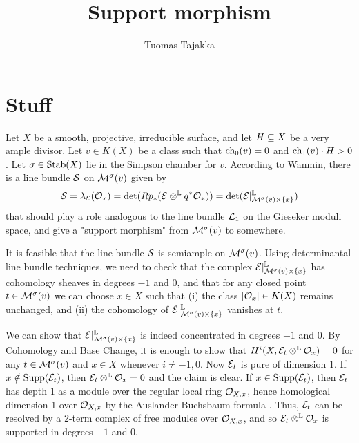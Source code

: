 \documentclass[letterpaper,10pt]{article}
\title{Support morphism}
\author{Tuomas Tajakka}
\date{}
\theoremstyle{remark}
\begin{document}
\maketitle

\section{Stuff}
Let $X$ be a smooth, projective, irreducible surface, and let $H \subseteq X$ be a very ample divisor. Let $v \in K(X)$ be a class such that $\operatorname{\mathrm{ch}}_0(v) = 0$ and $\operatorname{\mathrm{ch}}_1(v) \cdot H > 0$. Let $\sigma \in \operatorname{\mathrm{Stab}}(X)$ lie in the Simpson chamber for $v$. According to Wanmin, there is a line bundle $\mathcal{S}$ on $\mathcal{M}^\sigma(v)$ given by 
\[ \mathcal{S} = \lambda_{\mathcal{E}}(\mathcal{O}_x) = \det(R p_*(\mathcal{E} \otimes^{\mathbb{L}} q^* \mathcal{O}_x)) = \det(\mathcal{E}|^{\mathbb{L}}_{\mathcal{M}^\sigma(v) \times \{x\}}) \]
that should play a role analogous to the line bundle $\mathcal{L}_1$ on the Gieseker moduli space, and give a "support morphism" from $\mathcal{M}^\sigma(v)$ to somewhere. 

It is feasible that the line bundle $\mathcal{S}$ is semiample on $\mathcal{M}^\sigma(v)$. Using determinantal line bundle techniques, we need to check that the complex $\mathcal{E}|^{\mathbb{L}}_{\mathcal{M}^\sigma(v) \times \{x\}}$ has cohomology sheaves in degrees $-1$ and $0$, and that for any closed point $t \in \mathcal{M}^\sigma(v)$ we can choose $x \in X$ such that (i) the class $[\mathcal{O}_x] \in K(X)$ remains unchanged, and (ii) the cohomology of $\mathcal{E}|^{\mathbb{L}}_{\mathcal{M}^\sigma(v) \times \{x\}}$ vanishes at $t$.

We can show that $\mathcal{E}|^{\mathbb{L}}_{\mathcal{M}^\sigma(v) \times \{x\}}$ is indeed concentrated in degrees $-1$ and $0$. By Cohomology and Base Change, it is enough to show that $H^i(X, \mathcal{E}_t \otimes^{\mathbb{L}} \mathcal{O}_x) = 0$ for any $t 
\in \mathcal{M}^\sigma(v)$ and $x \in X$ whenever $i \neq -1, 0$. Now $\mathcal{E}_t$ is pure of dimension 1. If $x \notin \operatorname{\mathrm{Supp}}(\mathcal{E}_t)$, then $\mathcal{E}_t \otimes^{\mathbb{L}} \mathcal{O}_x = 0$ and the claim is clear. If $x \in \operatorname{\mathrm{Supp}}(\mathcal{E}_t)$, then $\mathcal{E}_t$ has depth 1 as a module over the regular local ring $\mathcal{O}_{X,x}$, hence homological dimension 1 over $\mathcal{O}_{X,x}$ by the Auslander-Buchsbaum formula \cite[equation (1.1)]{HL}. Thus, $\mathcal{E}_t$ can be resolved by a 2-term complex of free modules over $\mathcal{O}_{X,x}$, and so $\mathcal{E}_t \otimes^{\mathbb{L}} \mathcal{O}_x$ is supported in degrees $-1$ and $0$.









\end{document}
